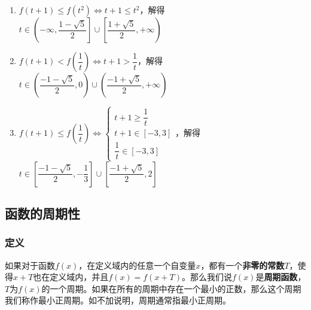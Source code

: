 \begin{enumerate}
\begin{jieda}
        \begin{enumerate}
            \item $f(t+1) \leq f(t^2) \Longleftrightarrow t+1 \leq t^2$，解得$t \in \left(-\infty, \dfrac{1-\sqrt{5}}{2}\right] \cup \left[\dfrac{1+\sqrt{5}}{2}, +\infty\right)$
            \item $f(t+1) < f\left(\dfrac{1}{t}\right) \Longleftrightarrow t+1 > \dfrac{1}{t} $，解得$t \in \left(\dfrac{-1-\sqrt{5}}{2}, 0\right) \cup \left(\dfrac{-1+\sqrt{5}}{2}, +\infty\right)$
            \item $f(t+1) \leq f\left(\dfrac{1}{t}\right) \Longleftrightarrow \left\{\begin{array}{l}
                 t+1 \geq \dfrac{1}{t}  \\
                 t + 1 \in [-3,3] \\
                 \dfrac{1}{t} \in [-3,3]
            \end{array}\right.$，解得$t \in \left[\dfrac{-1 - \sqrt{5}}{2}, -\dfrac{1}{3} \right] \cup \left[ \dfrac{-1 + \sqrt{5}}{2}, 2 \right]$
        \end{enumerate}
    \end{jieda}
\end{enumerate}
\subsection*{函数的周期性}
\subsubsection*{定义}
    如果对于函数$f(x)$，在定义域内的任意一个自变量$x$，都有一个\textbf{非零的常数}$T$，使得$x+T$也在定义域内，并且$f(x) = f(x+T)$。那么我们说$f(x)$是\textbf{周期函数}，$T$为$f(x)$的一个周期。如果在所有的周期中存在一个最小的正数，那么这个周期我们称作最小正周期。如不加说明，周期通常指最小正周期。
